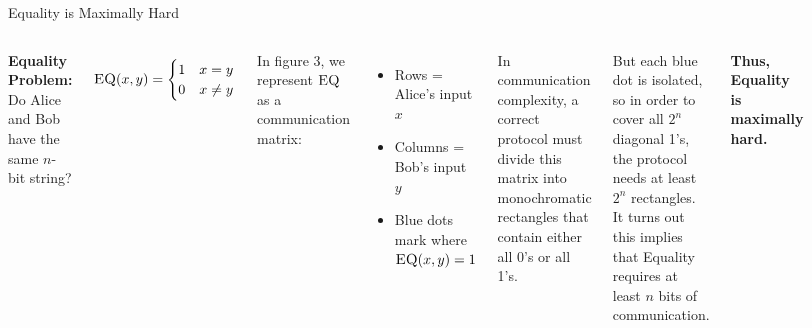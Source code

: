 \begin{block}{Equality is Maximally Hard}

\begin{columns}[T]


\textbf{Equality Problem:} Do Alice and Bob have the same $n$-bit string?

\[
\textsc{EQ}(x,y)=
\begin{cases}
1 & x=y \\
0 & x\neq y
\end{cases}
\]

\vspace{0.5em}

In figure 3, we represent $\textsc{EQ}$ as a communication matrix:

\begin{itemize}
    \item Rows = Alice's input $x$
    \item Columns = Bob's input $y$
    \item Blue dots mark where $\textsc{EQ}(x,y)=1$
\end{itemize}

\bigskip

In communication complexity, a correct protocol must divide this matrix into monochromatic rectangles that contain either all 0’s or all 1’s. \\

\vspace{0.5em}

But each blue dot is isolated, so in order to cover all $2^n$ diagonal 1’s, the protocol needs at least $2^n$ rectangles. It turns out this implies that Equality requires at least $n$ bits of communication. \\
\vspace{0.5em}

\textbf{Thus, Equality is maximally hard.}


\begin{figure}[H]
\begin{center}
\end{center}
\end{figure}
\end{columns}
\end{block}
